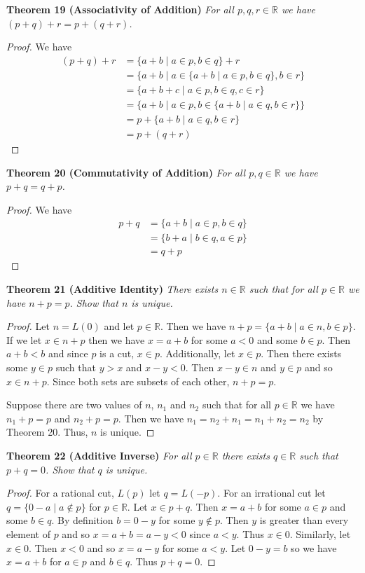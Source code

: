 \documentclass{article}
\begin{document}
\begin{flushleft}
\textbf{Theorem 19 (Associativity of Addition)}
\textsl{For all $p,q,r \in \mathbb{R}$ we have $(p+q)+r=p+(q+r)$.}
\begin{proof}
We have
\begin{align*}
(p+q)+r&=\{a+b \mid a \in p, b \in q\} + r \\
	  &=\{a+b \mid a \in \{a+b \mid a \in p, b \in q\}, b \in r\} \\
	  &=\{a+b+c \mid a \in p, b \in q, c \in r\} \\
	  &=\{a+b \mid a \in p, b \in \{a+b \mid a \in q, b \in r\}\} \\
	  &=p + \{a+b \mid a \in q, b \in r\} \\
	  &=p + (q+r)
\end{align*}
\end{proof}

\textbf{Theorem 20 (Commutativity of Addition)}
\textsl{For all $p,q \in \mathbb{R}$ we have $p+q = q+p$.}
\begin{proof}
We have
\begin{align*}
p+q &=\{a+b \mid a \in p, b \in q\} \\
     &=\{b+a \mid b \in q, a \in p\} \\
     &=q+p
\end{align*}
\end{proof}

\textbf{Theorem 21 (Additive Identity)}
\textsl{There exists $n \in \mathbb{R}$ such that for all $p \in \mathbb{R}$ we have $n+p=p$. Show that $n$ is unique.}
\begin{proof}
Let $n=L(0)$ and let $p \in \mathbb{R}$. Then we have $n+p=\{a+b \mid a \in n, b \in p\}$. If we let $x \in n+p$ then we have $x = a+b$ for some $a < 0$ and some $b \in p$. Then $a+b<b$ and since $p$ is a cut, $x \in p$. Additionally, let $x \in p$. Then there exists some $y \in p$ such that $y > x$ and $x-y < 0$. Then $x-y \in n$ and $y \in p$ and so $x \in n+p$. Since both sets are subsets of each other, $n+p=p$.\newline

Suppose there are two values of $n$, $n_1$ and $n_2$ such that for all $p \in \mathbb{R}$ we have $n_1+p=p$ and $n_2+p=p$. Then we have $n_1=n_2+n_1=n_1+n_2=n_2$ by Theorem 20. Thus, $n$ is unique.
\end{proof}

\textbf{Theorem 22 (Additive Inverse)}
\textsl{For all $p \in \mathbb{R}$ there exists $q \in \mathbb{R}$ such that $p+q=0$. Show that $q$ is unique.}
\begin{proof}
For a rational cut, $L(p)$ let $q = L(-p)$. For an irrational cut let $q=\{0-a \mid a \notin p\}$ for $p \in \mathbb{R}$. Let $x \in p+q$. Then $x=a+b$ for some $a \in p$ and some $b \in q$. By definition $b=0-y$ for some $y \notin p$. Then $y$ is greater than every element of $p$ and so $x=a+b=a-y<0$ since $a<y$. Thus $x \in 0$. Similarly, let $x \in 0$. Then $x<0$ and so $x=a-y$ for some $a<y$. Let $0-y=b$ so we have $x=a+b$ for $a \in p$ and $b \in q$. Thus $p+q=0$.\newline


\end{proof}
\end{flushleft}
\end{document}
